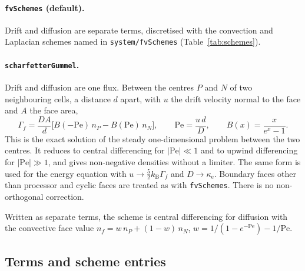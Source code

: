 \documentclass[11pt,a4paper]{article}
\newcommand{\kw}[1]{\texttt{#1}}
\newcommand{\kB}{k_\mathrm{B}}
\begin{document}
\paragraph{\kw{fvSchemes} (default).} Drift and diffusion are separate terms,
discretised with the convection and Laplacian schemes named in
\kw{system/fvSchemes} (Table~\ref{tab:schemes}).

\paragraph{\kw{scharfetterGummel}.} Drift and diffusion are one flux. Between
the centres $P$ and $N$ of two neighbouring cells, a distance $d$ apart, with
$u$ the drift velocity normal to the face and $A$ the face area,
\begin{equation}
\Gamma_f = \frac{D A}{d}\Big[B(-\mathrm{Pe})\,n_P - B(\mathrm{Pe})\,n_N\Big],
\qquad \mathrm{Pe}=\frac{u\,d}{D},\qquad B(x)=\frac{x}{e^{x}-1} .
\end{equation}
This is the exact solution of the steady one-dimensional problem between the
two centres. It reduces to central differencing for $|\mathrm{Pe}|\ll1$ and
to upwind differencing for $|\mathrm{Pe}|\gg1$, and gives non-negative
densities without a limiter. The same form is used for the energy equation
with $u\to\tfrac52\kB\Gamma_f$ and $D\to\kappa_\mathrm{e}$. Boundary faces
other than processor and cyclic faces are treated as with \kw{fvSchemes}.
There is no non-orthogonal correction.

Written as separate terms, the scheme is central differencing for diffusion
with the convective face value $n_f=w\,n_P+(1-w)\,n_N$,
$w=1/(1-e^{-\mathrm{Pe}})-1/\mathrm{Pe}$.

\subsection{Terms and scheme entries}
\end{document}
